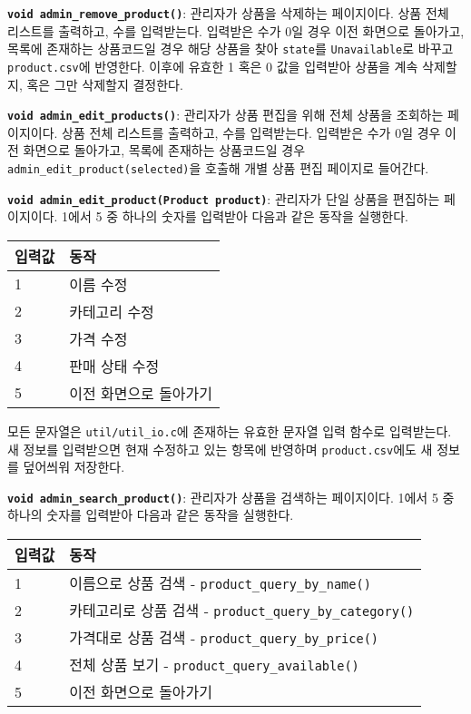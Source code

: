 \documentclass[runningheads]{llncs}
\begin{document}
\textbf{\texttt{void admin_remove_product()}}: 관리자가 상품을 삭제하는 페이지이다. 상품 전체 리스트를 출력하고, 수를 입력받는다. 입력받은 수가 0일 경우 이전 화면으로 돌아가고, 목록에 존재하는 상품코드일 경우 해당 상품을 찾아 \texttt{state}를 \texttt{Unavailable}로 바꾸고 \texttt{product.csv}에 반영한다. 이후에 유효한 1 혹은 0 값을 입력받아 상품을 계속 삭제할지, 혹은 그만 삭제할지 결정한다.

\textbf{\texttt{void admin_edit_products()}}: 관리자가 상품 편집을 위해 전체 상품을 조회하는 페이지이다. 상품 전체 리스트를 출력하고, 수를 입력받는다. 입력받은 수가 0일 경우 이전 화면으로 돌아가고, 목록에 존재하는 상품코드일 경우 \texttt{admin_edit_product(selected)}을 호출해 개별 상품 편집 페이지로 들어간다.

\textbf{\texttt{void admin_edit_product(Product product)}}: 관리자가 단일 상품을 편집하는 페이지이다. 1에서 5 중 하나의 숫자를 입력받아 다음과 같은 동작을 실행한다.

\begin{tabularx}{\textwidth}{l|X}
	\hline
		입력값	& 동작 \\
	\hline
		1 & 이름 수정 \\
		2 & 카테고리 수정 \\
		3 & 가격 수정 \\
		4 & 판매 상태 수정 \\
		5 & 이전 화면으로 돌아가기 \\
	\hline
\end{tabularx}

모든 문자열은 \texttt{util/util_io.c}에 존재하는 유효한 문자열 입력 함수로 입력받는다. 새 정보를 입력받으면 현재 수정하고 있는 항목에 반영하며 \texttt{product.csv}에도 새 정보를 덮어씌워 저장한다.

\textbf{\texttt{void admin_search_product()}}: 관리자가 상품을 검색하는 페이지이다. 1에서 5 중 하나의 숫자를 입력받아 다음과 같은 동작을 실행한다.

\begin{tabularx}{\textwidth}{l|X}
	\hline
		입력값	& 동작 \\
	\hline
		1 & 이름으로 상품 검색 - \texttt{product_query_by_name()} \\
		2 & 카테고리로 상품 검색 - \texttt{product_query_by_category()} \\
		3 & 가격대로 상품 검색 - \texttt{product_query_by_price()} \\
		4 & 전체 상품 보기 - \texttt{product_query_available()} \\
		5 & 이전 화면으로 돌아가기 \\
	\hline
\end{tabularx}
\end{document}
